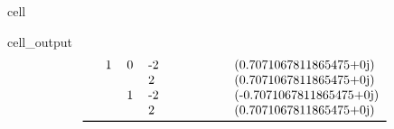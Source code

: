 \documentclass[letterpaper,table,10pt,english]{jupyterBook}
\begin{document}
\begin{sphinxuseclass}{cell}
\begin{sphinxVerbatimOutput}
\begin{sphinxuseclass}{cell_output}
\begin{equation*}
\begin{split}
\begin{tabular}{lllllllll}
    & 1 & 0 & -2 &         &   &                           &   &   (0.7071067811865475+0j) \\
    &   &   &  2 &         &   &                           &   &   (0.7071067811865475+0j) \\
    &   & 1 & -2 &         &   &                           &   &  (-0.7071067811865475+0j) \\
    &   &   &  2 &         &   &                           &   &   (0.7071067811865475+0j) \\
\bottomrule
\end{tabular}\end{split}
\end{equation*}
\end{sphinxuseclass}\end{sphinxVerbatimOutput}

\end{sphinxuseclass}
\end{document}
